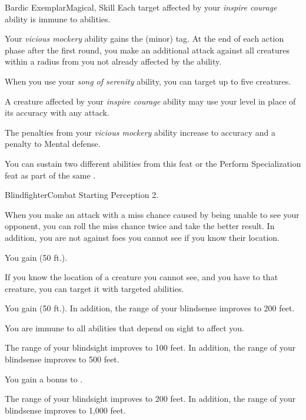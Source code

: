 \begin{feat}{Bardic Exemplar}{Magical, Skill}
         Each target affected by your \textit{inspire courage} ability is immune to  abilities.

         Your \textit{vicious mockery} ability gains the  (minor) tag.
        At the end of each action phase after the first round, you make an additional attack against all creatures within a \areahuge radius from you not already affected by the ability.

         When you use your \textit{song of serenity} ability, you can target up to five creatures.

         A creature affected by your \textit{inspire courage} ability may use your level in place of its accuracy with any attack.

         The penalties from your \textit{vicious mockery} ability increase to  accuracy and a  penalty to Mental defense.

         You can sustain two different  abilities from this feat or the Perform Specialization feat as part of the same .
    \end{feat}

    \begin{feat}{Blindfighter}{Combat}
        \featpre Starting Perception 2.

         When you make an attack with a miss chance caused by being unable to see your opponent, you can roll the miss chance twice and take the better result.
        In addition, you are not  against foes you cannot see if you know their location.

         You gain  (50 ft.).

         If you know the location of a creature you cannot see, and you have  to that creature, you can target it with targeted abilities.

         You gain  (50 ft.).
        In addition, the range of your blindsense improves to 200 feet.

         You are immune to all abilities that depend on sight to affect you.

         The range of your blindsight improves to 100 feet.
        In addition, the range of your blindsense improves to 500 feet.

         You gain a  bonus to .

         The range of your blindsight improves to 200 feet.
        In addition, the range of your blindsense improves to 1,000 feet.
    \end{feat}

